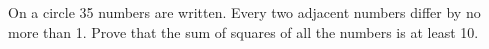 \problem
On a circle 35 numbers are written.
Every two adjacent numbers differ by no more than 1.
Prove that the sum of squares of all the numbers is at least 10.
\solution
\endproblem
